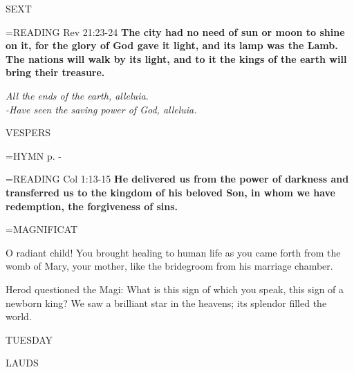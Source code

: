 \begin{flushleft}\normalsize SEXT\\\end{flushleft}

\hangindent=\parindent \small{\uppercase{READING}}    Rev 21:23-24 \textbf{   The city had no need of sun or moon to shine on it, for the glory of God gave it light, and its lamp was the Lamb. The nations will walk by its light, and to it the kings of the earth will bring their treasure.\\}

\begin{center}
\textit{All the ends of the earth, alleluia.\\
-Have seen the saving power of God, alleluia.}
\end{center}

\begin{flushleft}\normalsize VESPERS\\\end{flushleft}

\hangindent=\parindent \small{\uppercase{HYMN} p. \pageref{christmas:firstHymn}-\pageref{christmas:lastHymn}\\}

\hangindent=\parindent \small{\uppercase{READING}}    Col 1:13-15 \textbf{   He delivered us from the power of darkness and transferred us to the kingdom of his beloved Son, in whom we have redemption, the forgiveness of sins.\\}

\hangindent=\parindent \small MAGNIFICAT
\begin{description}[labelindent=\parindent, leftmargin=*]
\item [(before the Epiphany):]  O radiant child! You brought healing to human life as you came forth from the womb of Mary, your mother, like the bridegroom from his marriage chamber.
\item [(Wednesday after the Epiphany):]  Herod questioned the Magi: What is this sign of which you speak, this sign of a newborn king? We saw a brilliant star in the heavens; its splendor filled the world.
\end{description}


\begin{center}
\normalsize TUESDAY
\end{center}

\begin{flushleft}\normalsize LAUDS\\\end{flushleft}

